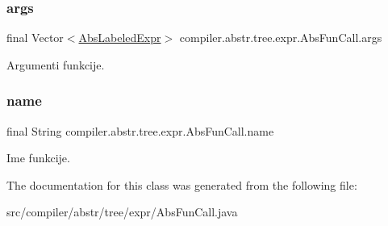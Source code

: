 \subsubsection{\texorpdfstring{args}{args}}
{\footnotesize\ttfamily final Vector$<$\hyperlink{classcompiler_1_1abstr_1_1tree_1_1expr_1_1_abs_labeled_expr}{Abs\+Labeled\+Expr}$>$ compiler.\+abstr.\+tree.\+expr.\+Abs\+Fun\+Call.\+args}

Argumenti funkcije. \mbox{\label{classcompiler_1_1abstr_1_1tree_1_1expr_1_1_abs_fun_call_aa9a892390ef5c6cdc31ed3b47ebe0df7}} 
\subsubsection{\texorpdfstring{name}{name}}
{\footnotesize\ttfamily final String compiler.\+abstr.\+tree.\+expr.\+Abs\+Fun\+Call.\+name}

Ime funkcije. 

The documentation for this class was generated from the following file\+:\begin{DoxyCompactItemize}
\item 
src/compiler/abstr/tree/expr/Abs\+Fun\+Call.\+java\end{DoxyCompactItemize}
